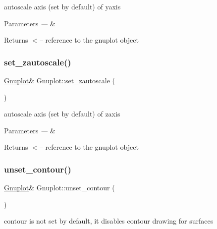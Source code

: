 autoscale axis (set by default) of yaxis


\begin{DoxyParams}{Parameters}
{\em ---} & \\
\hline
\end{DoxyParams}
\begin{DoxyReturn}{Returns}
$<$-- reference to the gnuplot object 
\end{DoxyReturn}
\mbox{\label{classGnuplot_aef3e84e793836158e1ddd773d1465c37}} 
\subsubsection{\texorpdfstring{set\+\_\+zautoscale()}{set\_zautoscale()}}
{\footnotesize\ttfamily \hyperlink{classGnuplot}{Gnuplot}\& Gnuplot\+::set\+\_\+zautoscale (\begin{DoxyParamCaption}{ }\end{DoxyParamCaption})\hspace{0.3cm}{\ttfamily [inline]}}

autoscale axis (set by default) of zaxis


\begin{DoxyParams}{Parameters}
{\em ---} & \\
\hline
\end{DoxyParams}
\begin{DoxyReturn}{Returns}
$<$-- reference to the gnuplot object 
\end{DoxyReturn}
\mbox{\label{classGnuplot_a0b8522cb81e46dd4f5a22b7b48f977b1}} 
\subsubsection{\texorpdfstring{unset\+\_\+contour()}{unset\_contour()}}
{\footnotesize\ttfamily \hyperlink{classGnuplot}{Gnuplot}\& Gnuplot\+::unset\+\_\+contour (\begin{DoxyParamCaption}{ }\end{DoxyParamCaption})\hspace{0.3cm}{\ttfamily [inline]}}

contour is not set by default, it disables contour drawing for surfaces


